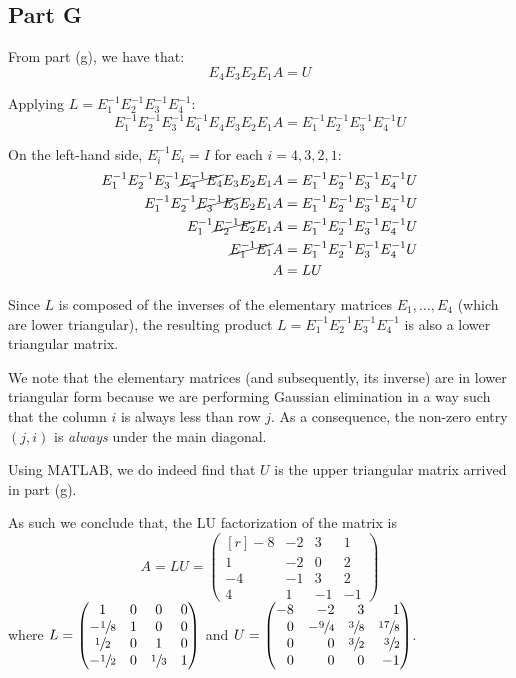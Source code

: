 \documentclass[12pt]{article}
\begin{document}
\subsection*{Part G}

From part (g), we have that:
$$
E_4E_3E_2E_1 A = U
$$

Applying $L=E_1^{-1}E_2^{-1}E_3^{-1}E_4^{-1}$:
$$
E_1^{-1}E_2^{-1}E_3^{-1}E_4^{-1} E_4E_3E_2E_1 A = E_1^{-1}E_2^{-1}E_3^{-1}E_4^{-1}U
$$

On the left-hand side, $E_i^{-1}E_i = I$ for each $i=4,3,2,1$:
\begin{align*}
    E_1^{-1}E_2^{-1}E_3^{-1}\cancel{E_4^{-1} E_4}E_3E_2E_1 A 
    &= E_1^{-1}E_2^{-1}E_3^{-1}E_4^{-1}U \\
    E_1^{-1}E_2^{-1}\cancel{E_3^{-1} E_3}E_2E_1 A 
    &= E_1^{-1}E_2^{-1}E_3^{-1}E_4^{-1}U \\
    E_1^{-1}\cancel{E_2^{-1} E_2}E_1 A 
    &= E_1^{-1}E_2^{-1}E_3^{-1}E_4^{-1}U \\
    \cancel{E_1^{-1} E_1} A
    &= E_1^{-1}E_2^{-1}E_3^{-1}E_4^{-1}U \\
    A &= LU
\end{align*}

Since $L$ is composed of the inverses of the elementary matrices $E_1,\ldots,E_4$ (which are lower triangular), the resulting product $L=E_1^{-1}E_2^{-1}E_3^{-1}E_4^{-1}$ is also a lower triangular matrix.

We note that the elementary matrices (and subsequently, its inverse) are in lower triangular form because we are performing Gaussian elimination in a way such that the column $i$ is always less than row $j$. As a consequence, the non-zero entry $(j,i)$ is \textit{always} under the main diagonal.

Using MATLAB, we do indeed find that $U$ is the upper triangular matrix arrived in part (g). 

As such we conclude that, the LU factorization of the matrix is
$$
A = LU = \begin{pmatrix*}[r]
    -8 & -2 & 3 & 1 \\
    1 & -2 &  0  & 2 \\
    -4 & -1 & 3 & 2 \\
    4 & 1 & -1 & -1
\end{pmatrix*}
$$
where $L = \begin{pmatrix*}[c]
    1 & 0 & 0 & 0 \\
    -\sfrac{1}{8} & 1 & 0 & 0 \\
    \sfrac{1}{2} & 0 & 1 & 0 \\
    -\sfrac{1}{2} & 0 & \sfrac{1}{3} & 1
\end{pmatrix*}$ and
$U = \begin{pmatrix*}[r]
    -8 & -2 & 3 & 1 \\
    0 & -\sfrac{9}{4} & \sfrac{3}{8}  & \sfrac{17}{8} \\
    0 & 0 & \sfrac{3}{2} & \sfrac{3}{2} \\
    0 & 0 & 0 & -1
\end{pmatrix*}$.
\end{document}
